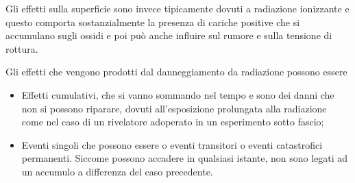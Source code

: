 
Gli effetti sulla superficie sono invece tipicamente dovuti a radiazione ionizzante e questo comporta sostanzialmente la presenza di cariche positive che si accumulano sugli ossidi e poi può anche influire sul rumore e sulla tensione di rottura.

Gli effetti che vengono prodotti dal danneggiamento da radiazione possono essere
\begin{itemize}[leftmargin=0.5cm]
   \item Effetti cumulativi, che si vanno sommando nel tempo e sono dei danni che non si possono riparare, dovuti all'esposizione prolungata alla radiazione come nel caso di un rivelatore adoperato in un esperimento sotto fascio;
   \item Eventi singoli che possono essere o eventi transitori o eventi catastrofici permanenti. Siccome possono accadere in qualsiasi istante, non sono legati ad un accumulo a differenza del caso precedente.
\end{itemize}

